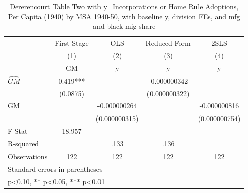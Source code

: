\begin{table}[htbp]\centering
\def\sym#1{\ifmmode^{#1}\else\(^{#1}\)\fi}
\caption{Dererencourt Table Two with y=Incorporations or Home Rule Adoptions, Per Capita (1940) by MSA 1940-50, with baseline y, division FEs, and mfg and black mig share}
\begin{tabular}{l*{4}{c}}
\toprule
                    & First Stage   &         OLS   &Reduced Form   &        2SLS   \\
                    &\multicolumn{1}{c}{(1)}&\multicolumn{1}{c}{(2)}&\multicolumn{1}{c}{(3)}&\multicolumn{1}{c}{(4)}\\
                    &\multicolumn{1}{c}{GM}&\multicolumn{1}{c}{y}&\multicolumn{1}{c}{y}&\multicolumn{1}{c}{y}\\
\midrule
$\hat{GM}$          &       0.419***&               &-0.000000342   &               \\
                    &    (0.0875)   &               &(0.000000322)   &               \\
\addlinespace
GM                  &               &-0.000000264   &               &-0.000000816   \\
                    &               &(0.000000315)   &               &(0.000000754)   \\
\midrule
F-Stat              &      18.957   &               &               &               \\
R-squared           &               &        .133   &        .136   &               \\
Observations        &         122   &         122   &         122   &         122   \\
\bottomrule
\multicolumn{5}{l}{\footnotesize Standard errors in parentheses}\\
\multicolumn{5}{l}{\footnotesize * p<0.10, ** p<0.05, *** p<0.01}\\
\end{tabular}
\end{table}
